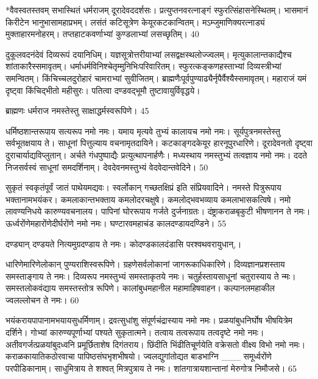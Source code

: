 *वैवस्वतस्तवम् सभास्थितं धर्मराजम् दूरादेवददर्शसः।
प्रत्युप्तनवरत्नाङ्गं स्फुरत्सिंहासनेस्थितम्।
भासमानं किरीटेन भानुभासामहाप्रभम्।
लसंतं कटिसूत्रेण केयूरकटकान्वितम्।
मऽम्जुमाणिक्यरत्नाड्यं मुक्ताहारमनोहरम्।
तप्तहाटकवर्णाभ्यां कुण्डलाभ्यां लसच्छृतिम्।
40

दुकूलवदनंदेवं दिव्यरूपं दयानिधिम्।
यज्ञसूत्रोत्तरीयाभ्यां लसद्वक्षस्थलोज्ज्वलम्।
मृत्युकालान्तकाद्यैश्च शांताकारैस्समावृतम्।
धर्माधर्मविनिश्चेतृम्मुनिभिःपरिवारितम्।
स्फुरत्कङ्कणहस्ताभ्यां दिव्यस्त्रीभ्यां समन्वितम्।
किंचिच्चलदुरोहारं चामराभ्यां सुवीजितम्।
ब्राह्मणैःपूर्वपुण्याढ्यैर्नृपैर्वैश्यैस्समावृतम्।
महाराजं यमं दृष्ट्वा किंचिद्भीतो महीसुरः।
पतित्वा दण्डवद्भूमौ तुष्टावायुर्विवृद्धये।

ब्राह्मणः
धर्मराज नमस्तेस्तु साक्षाद्धर्मस्वरूपिणे।
45


धर्मिष्ठशान्तरूपाय सत्यरूप नमो नमः।
यमाय मृत्यवे तुभ्यं कालायच नमो नमः।
सूर्यपुत्रनमस्तेस्तु सर्वभूतक्षयाय ते।
साधूनां पित्तुल्याय वचनामृतदायिने।
कटकाङ्गदकेयूर हारनूपुरधारिणे।
दूरादेवनतो दृष्ट्वा दुराचार्याद्यविप्लुतान्।
अर्चते गंधपुष्पाद्यैः प्रत्युत्थापनार्हणैः।
मध्यस्थाय नमस्तुभ्यं तत्वज्ञाय नमो नमः।
ददते निजसर्वस्वं साधूनां समदर्शिनाम्।
देवदेवनमस्तुभ्यं वेदवेदान्तवेदिने।
50

सुकृतं स्वकृतंपूर्वं जातं पाथेयमद्यवः।
स्वर्लोकान् गच्छतक्षिप्रं इति संप्रियवादिने।
नमस्ते पित्रुरूपाय भक्तानामभयंकर।
कमलाकान्तभक्ताय कमलोदरचक्षुषे।
कमलोद्भवभव्याय कमलाभासकत्विषे।
नमो लावण्यनिधये कारुण्यवचनालय।
पापिनां घोररूपाय गर्जते दुर्जनाग्रतः।
दंष्ट्राकराळबृकुटी भीषणानन ते नमः।
ऊर्ध्वरोंणेमहारोंणेदीर्घरोंणे नमो नमः।
घण्टारवमहाचंड कालदण्डायदण्डिने।
55

दण्ड्यान् दण्डयते नित्यमुग्रदण्डाय ते नमः।
कोदण्डकालदंडासि परश्वथवरायुधान्,।

धारिणेमारिणेलोकान् पुण्यराशिस्वरूपिणे।
ग्रहणेसर्वलोकानां जागरूकाधिकारिणे।
दिव्यज्ञानप्रशस्ताय समस्ताङ्गाय ते नमः।
दिव्यरूप नमस्तुभ्यं समस्ताकृतये नमः।
चतुर्हस्तायसाधूनां चतुरास्याय ते न्मः।
समस्तलोकवंद्याय समस्तस्तोत्र रूपिणे।
कालांबुधमहानील महामाहिषवाहन।
कल्पानलमहाकील ज्वलल्लोचन ते नमः।
60

भयंकरायपापानामभयायसुधर्मिणाम्।
द्रवत्सुधांशु संपूर्णचंद्रास्याय नमो नमः।
प्रळयांबुधनिर्घोष भीषयित्रेम दर्शिने।
गोभ्यां कारुण्यपूर्णाभ्यां पश्यते सुकृतात्मने।
तत्वाय तत्वरूपाय तत्वदृष्टे नमो नमः।
अतीवगर्जत्प्रळयांबुदध्वनि
प्रमूर्छिताशेष दिगंतराय।
छिंदीति भिंढीतिचूर्णयेति वक्रेसतो
वीक्ष्य विभो नमो नमः।
कराळकायातिकठोरवाचा पापिष्ठसंघभृशभीषयो।
ज्वलद्युगांतोद्यत बाडभाग्नि
___ समूर्ध्वरोंणे परपीडिकानाम्।
साधुमित्राय ते शश्वत् मित्रपुत्राय ते नमः।
शांतगात्रायशान्तानां मेरुगोत्र निमौजसे।
65



